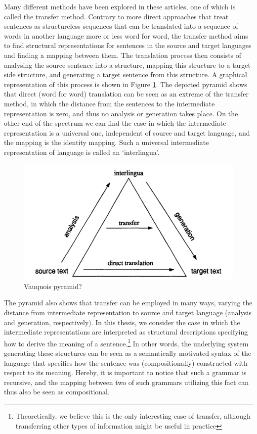\documentclass[a4paper, 11pt]{report}
\theoremstyle{definition}
\theoremstyle{plain}
\begin{document}
Many different methods have been explored in these articles, one of which is called the transfer method. Contrary to more direct approaches that treat sentences as structureless sequences that can be translated into a sequence of words in another language more or less word for word, the transfer method aims to find structural representations for sentences in the source and target languages and finding a mapping between them. The translation process then consists of analysing the source sentence into a structure, mapping this structure to a target side structure, and generating a target sentence from this structure. A graphical representation of this process is shown in Figure \ref{fig:triangle}. The depicted pyramid shows that direct (word for word) translation can be seen as an extreme of the transfer method, in which the distance from the sentences to the intermediate representation is zero, and thus no analysis or generation takes place. On the other end of the spectrum we can find the case in which the intermediate representation is a universal one, independent of source and target language, and the mapping is the identity mapping. Such a universal intermediate representation of language is called an `interlingua'. 


\begin{figure}[!ht]
\centering
\includegraphics[scale=0.2]{translation_triangle.png}
\caption{Vauquois pyramid?}\label{fig:triangle}
\end{figure}

The pyramid also shows that transfer can be employed in many ways, varying the distance from intermediate representation to source and target language (analysis and generation, respectively). In this thesis, we consider the case in which the intermediate representations are interpreted as structural descriptions specifying how to derive the meaning of a sentence.\footnote{Theoretically, we believe this is the only interesting case of transfer, although transferring other types of information might be useful in practice} In other words, the underlying system generating these structures can be seen as a semantically motivated syntax of the language that specifies how the sentence was (compositionally) constructed with respect to its meaning. Hereby, it is important to notice that such a grammar is recursive, and the mapping between two of such grammars utilizing this fact can thus also be seen as compositional.
\end{document}
